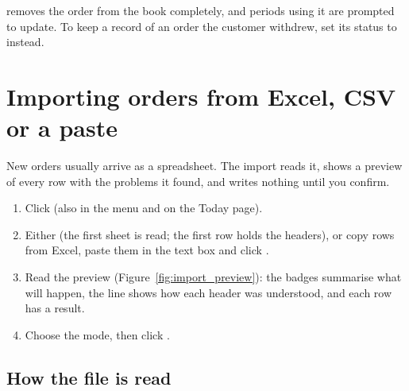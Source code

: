 \begin{warning}
 removes the order from the book completely, and periods using it are prompted to update. To keep
a record of an order the customer withdrew, set its status to  instead.
\end{warning}

\section{Importing orders from Excel, CSV or a paste}\label{sec:import}

New orders usually arrive as a spreadsheet. The import reads it, shows a preview of every row with the
problems it found, and writes nothing until you confirm.


\begin{steps}
\begin{enumerate}
  \item Click  (also in the  menu and on the Today page).
  \item Either  (the first sheet is read; the first row holds the headers),
        or copy rows from Excel, paste them in the text box and click .
  \item Read the preview (Figure~\ref{fig:import_preview}): the badges summarise what will happen, the
         line shows how each header was understood, and each row has a result.
  \item Choose the mode, then click .
\end{enumerate}
\end{steps}


\subsection{How the file is read}

